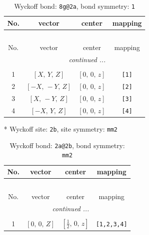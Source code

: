 \documentclass[fleqn,8pt]{jsarticle}
\begin{document}
\begin{longtable}{cccc}
\caption{Wyckoff bond: {\tt 8g@2a}, bond symmetry: {\tt 1}}
 \\
 \hline \hline
No. & vector & center & mapping \\ \hline \endfirsthead

\multicolumn{3}{l}{\tablename\ \thetable{}} \\
 \hline \hline
No. & vector & center & mapping \\ \hline \endhead

 \hline \hline
\multicolumn{3}{r}{\footnotesize\it continued ...} \\ \endfoot

 \hline \hline
\multicolumn{3}{r}{} \\ \endlastfoot

1 & $\left[ X,\, Y,\, Z \right]$ & $\left[ 0,\, 0,\, z \right]$ & {\tt [1]} \\ \hline
2 & $\left[ - X,\, - Y,\, Z \right]$ & $\left[ 0,\, 0,\, z \right]$ & {\tt [2]} \\ \hline
3 & $\left[ X,\, - Y,\, Z \right]$ & $\left[ 0,\, 0,\, z \right]$ & {\tt [3]} \\ \hline
4 & $\left[ - X,\, Y,\, Z \right]$ & $\left[ 0,\, 0,\, z \right]$ & {\tt [4]} \\
\end{longtable}
* Wyckoff site: {\tt 2b}, site symmetry: {\tt mm2}
\renewcommand{\arraystretch}{1.2}
\begin{longtable}{cccc}
\caption{Wyckoff bond: {\tt 2a@2b}, bond symmetry: {\tt mm2}}
 \\
 \hline \hline
No. & vector & center & mapping \\ \hline \endfirsthead

\multicolumn{3}{l}{\tablename\ \thetable{}} \\
 \hline \hline
No. & vector & center & mapping \\ \hline \endhead

 \hline \hline
\multicolumn{3}{r}{\footnotesize\it continued ...} \\ \endfoot

 \hline \hline
\multicolumn{3}{r}{} \\ \endlastfoot

1 & $\left[ 0,\, 0,\, Z \right]$ & $\left[ \frac{1}{2},\, 0,\, z \right]$ & {\tt [1,2,3,4]} \\
\end{longtable}
\renewcommand{\arraystretch}{1.2}
\end{document}

